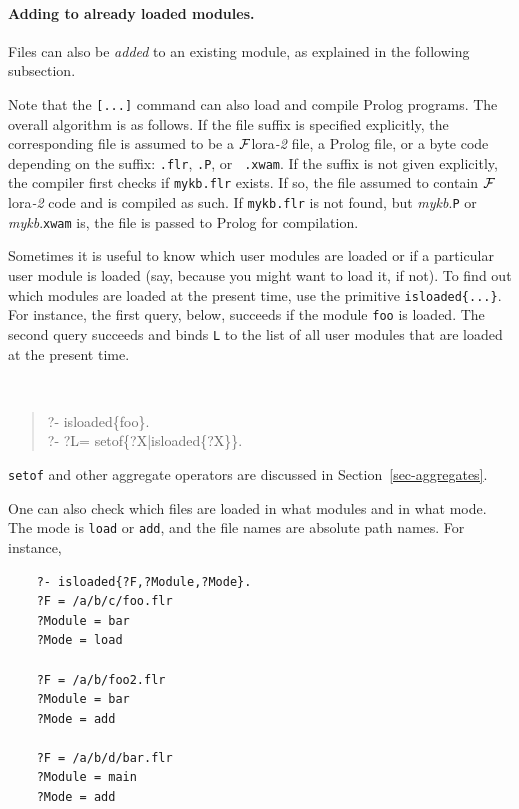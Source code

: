 \documentclass[11pt]{article}
\newcommand{\FLORA}{{\mbox{\sc ${\cal F}${lora}\rm\emph{-2}}}\xspace}
\newcommand{\FLSYSTEM}{\FLORA}
\newcommand{\flrext}{flr\xspace}
\newcommand{\ofile}{xwam}
\begin{document}
\paragraph{Adding to already loaded modules.}
Files can also be \emph{added} to an existing module, as explained in the
following subsection. 

Note that the {\tt [...]} command can also load and compile Prolog programs.
The overall algorithm is as follows. If the file suffix is specified
explicitly, the corresponding file is assumed to be a \FLSYSTEM file, a Prolog
file, or a byte code depending on the suffix: {\tt .\flrext}, {\tt .P}, or {\tt
  .\ofile}. If the suffix is not given explicitly, the compiler first checks if
\texttt{mykb.\flrext}  exists. If so, the file assumed to contain \FLSYSTEM
code and is compiled as such. If \texttt{mykb.\flrext}  is not found, but {\it
  mykb}.{\tt P} or {\it mykb}.{\tt xwam} is, the file is passed to Prolog for
compilation.


Sometimes it is useful to know which user modules are loaded or if a
particular user module is loaded (say, because you might want to load it,
if not).  To find out which modules are loaded at the present time, use the
primitive {\tt isloaded\{...\}}. For instance, the first query,
below, succeeds if the module {\tt foo} is loaded. The second query
succeeds and binds {\tt L} to the list of all user modules that are loaded
at the present time.
{\tt
\begin{quote}
 ?- isloaded\{foo\}.\\
 ?- ?L= setof\{?X|isloaded\{?X\}\}.
\end{quote}
}
\texttt{setof} and other aggregate operators are discussed in
Section~\ref{sec-aggregates}.

One can also check which files are loaded in what modules and in what mode.
The mode is \texttt{load} or \texttt{add}, and the file names are absolute
path names. For instance, 
\begin{verbatim}
    ?- isloaded{?F,?Module,?Mode}.
    ?F = /a/b/c/foo.flr
    ?Module = bar
    ?Mode = load

    ?F = /a/b/foo2.flr
    ?Module = bar
    ?Mode = add

    ?F = /a/b/d/bar.flr
    ?Module = main
    ?Mode = add
\end{verbatim}
\end{document}
